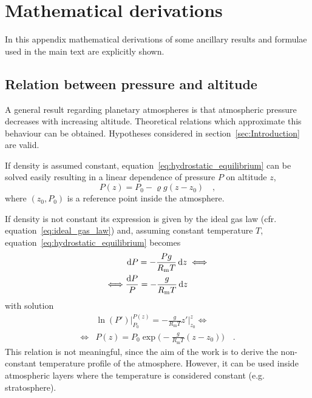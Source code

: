 \documentclass[a4paper,10pt,twocolumn,\classoptions]{article}
\begin{document}

\twocolumn



\section{Mathematical derivations}
In this appendix mathematical derivations of some ancillary results and formulae used in the main text are explicitly shown.



\subsection{Relation between pressure and altitude}
\label{sec:Relation between pressure and altitude}
A general result regarding planetary atmospheres is that atmospheric pressure decreases with increasing altitude. Theoretical relations which approximate this behaviour can be obtained. Hypotheses considered in section~\ref{sec:Introduction} are valid.

If density is assumed constant, equation~\eqref{eq:hydrostatic_equilibrium} can be solved easily resulting in a linear dependence of pressure $P$ on altitude $z$,
\begin{equation}
  \label{eq:pressure_constant_density}
  P(z) = P_0 - \varrho g (z - z_0)
  \quad ,
\end{equation}
where $(z_0, P_0)$ is a reference point inside the atmosphere.

If density is not constant its expression is given by the ideal gas law (cfr. equation~\eqref{eq:ideal_gas_law}) and, assuming constant temperature $T$, equation~\eqref{eq:hydrostatic_equilibrium} becomes
\begin{equation}
  \label{eq:hydrostatic_equilibrium_ideal_gas_law_constant_temperature}
  \begin{split}
    & \odif{P} = - \frac{P g}{R_\text{m} T} \odif{z} \iff \\
    \iff & \frac{\odif{P}}{P} = - \frac{g}{R_\text{m} T} \odif{z}
  \end{split}
\end{equation}
with solution
\begin{equation}
  \label{eq:pressure_constant_temperature}
  \begin{split}
    & \ln(P') \bigg|_{P_0}^{P(z)} = - \frac{g}{R_\text{m} T} z' \bigg|_{z_0}^{z} \iff \\
    \iff & P(z) = P_0 \exp{\bigg( - \frac{g}{R_\text{m} T} (z - z_0) \bigg)}
    \quad .
  \end{split}
\end{equation}
This relation is not meaningful, since the aim of the work is to derive the non-constant temperature profile of the atmosphere. However, it can be used inside atmospheric layers where the temperature is considered constant (e.g. stratosphere).
\end{document}
